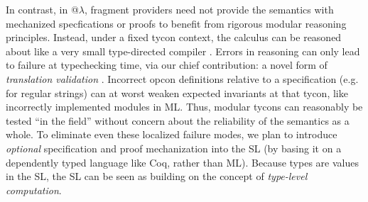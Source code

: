 \documentclass[pldi]{sigplanconf-pldi15}
\begin{document}
In contrast, in @$\lambda$, fragment providers need not provide the semantics with mechanized specfications or proofs to benefit from rigorous modular reasoning principles. Instead, under a fixed tycon context, the calculus can be reasoned about like a very small type-directed compiler \cite{tarditi+:til-OLD,conf/pldi/Chlipala07,Dave:2003:CVB:966221.966235}. Errors in reasoning can only lead to failure at typechecking time, via our chief contribution: a novel form of \emph{translation validation} \cite{Pnueli-Siegel-Singerman98}. Incorrect opcon definitions relative to a specification (e.g. \cite{sanitation-psp14} for regular strings) can at worst weaken expected invariants at that tycon, like incorrectly implemented modules in ML. Thus, modular tycons can reasonably be tested ``in the field'' without concern about the reliability of the semantics as a whole. 
To eliminate even these localized failure modes, we plan to introduce \emph{optional} specification and proof mechanization into the SL (by basing it on a dependently typed language like Coq, rather than ML). Because types are values in the SL, the SL can be seen as building on the concept of \emph{type-level computation}. %
\end{document}

